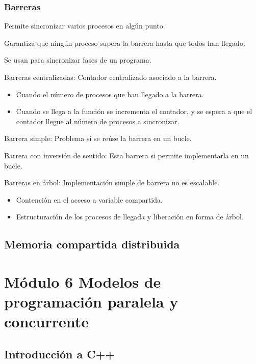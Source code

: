 \documentclass[12pt, twoside, openright]{report} %
\begin{document}
\subsection{Barreras}

Permite sincronizar varios procesos en algún punto.


    Garantiza que ningún proceso supera la barrera hasta que todos han
    llegado.

    Se usan para sincronizar fases de un programa.

    Barreras centralizadas: Contador centralizado asociado a la
    barrera.

    \begin{itemize}
    
    \item
      Cuando el número de procesos que han llegado a la barrera.
    \item
      Cuando se llega a la función se incrementa el contador, y se
      espera a que el contador llegue al número de procesos a
      sincronizar.
    \end{itemize}

    Barrera simple: Problema si se reúse la barrera en un bucle.

    Barrera con inversión de sentido: Esta barrera si permite
    implementarla en un bucle.

    Barreras en árbol: Implementación simple de barrera no es
    escalable.

    \begin{itemize}
    
    \item
      Contención en el acceso a variable compartida.
    \item
      Estructuración de los procesos de llegada y liberación en forma
      de árbol.
    \end{itemize}

    
  
\section{Memoria compartida distribuida}



  \chapter{Módulo 6 Modelos de programación paralela y concurrente}

\section{Introducción a C++}
\end{document}
